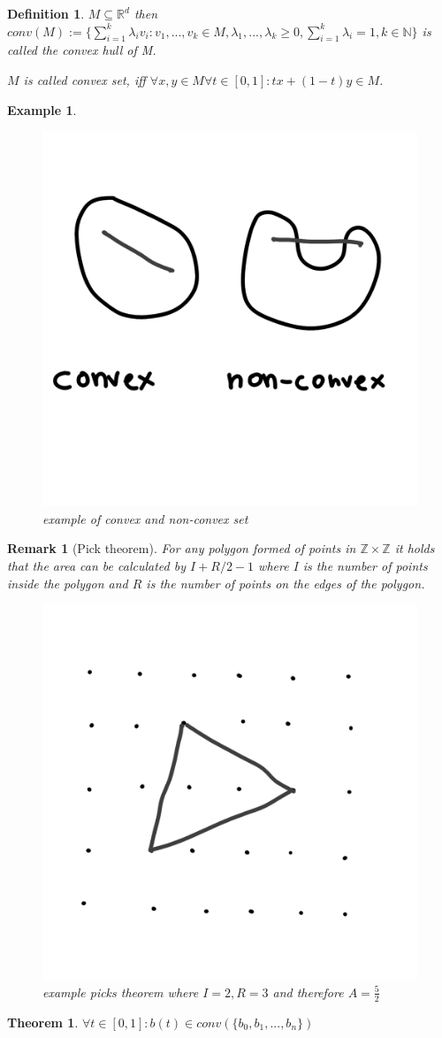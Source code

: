 \documentclass[]{article}
\newtheorem{theorem}{Theorem}
\newtheorem{definition}{Definition}
\newtheorem{example}{Example}
\newtheorem{remark}{Remark}
\begin{document}
\begin{definition}
	$M \subseteq \mathbb{R}^d$ then $conv(M) := \{\sum_{i=1}^{k} \lambda_i v_i : v_1, ..., v_k \in M, \lambda_1, ..., \lambda_k \geq 0, \sum_{i=1}^{k} \lambda_i = 1, k\in \mathbb{N}\}$ is called the convex hull of M.
	
	$M$ is called convex set, iff $\forall x,y \in M \forall t\in[0,1]: tx+(1-t)y \in M$.
\end{definition}

\begin{example}
	\begin{figure}[h!]
		\centering
		\includegraphics[width=0.3\linewidth]{figures/convex_non_convex}
		\caption{example of convex and non-convex set}
		\label{fig:convex_non_convex}
	\end{figure}
\end{example}

\begin{remark}[Pick theorem]
	For any polygon formed of points in $\mathbb{Z}\times\mathbb{Z}$ it holds that the area can be calculated by $I + R/2 - 1$ where $I$ is the number of points inside the polygon and $R$ is the number of points on the edges of the polygon.
	
	\begin{figure}[h!]
		\centering
		\includegraphics[width=0.3\linewidth]{figures/pick}
		\caption{example picks theorem where $I=2, R=3$ and therefore $A=\frac{5}{2}$}
		\label{fig:pick}
	\end{figure}
\end{remark}

\begin{theorem}
	$\forall t \in [0,1]: b(t) \in conv(\{b_0, b_1, ..., b_n\})$
\end{theorem}
\end{document}
